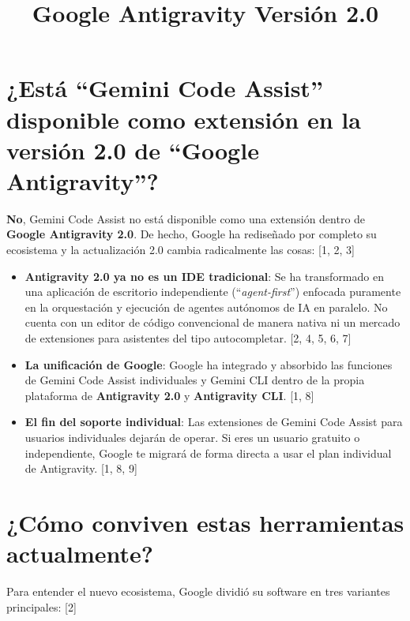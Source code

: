 \documentclass[12pt, a4paper]{article}
\title{Google Antigravity Versión 2.0}
\author{}
\date{}
\begin{document}
\maketitle

\section*{¿Está ``Gemini Code Assist'' disponible como extensión en la versión 2.0 de ``Google Antigravity''?}

\textbf{No}, Gemini Code Assist no está disponible como una extensión dentro de \textbf{Google Antigravity 2.0}. De hecho, Google ha rediseñado por completo su ecosistema y la actualización 2.0 cambia radicalmente las cosas: [1, 2, 3]

\begin{itemize}
    \item \textbf{Antigravity 2.0 ya no es un IDE tradicional}: Se ha transformado en una aplicación de escritorio independiente (``\textit{agent-first}'') enfocada puramente en la orquestación y ejecución de agentes autónomos de IA en paralelo. No cuenta con un editor de código convencional de manera nativa ni un mercado de extensiones para asistentes del tipo autocompletar. [2, 4, 5, 6, 7]
    \item \textbf{La unificación de Google}: Google ha integrado y absorbido las funciones de Gemini Code Assist individuales y Gemini CLI dentro de la propia plataforma de \textbf{Antigravity 2.0} y \textbf{Antigravity CLI}. [1, 8]
    \item \textbf{El fin del soporte individual}: Las extensiones de Gemini Code Assist para usuarios individuales dejarán de operar. Si eres un usuario gratuito o independiente, Google te migrará de forma directa a usar el plan individual de Antigravity. [1, 8, 9]
\end{itemize}

\section*{¿Cómo conviven estas herramientas actualmente?}

Para entender el nuevo ecosistema, Google dividió su software en tres variantes principales: [2]
\end{document}
